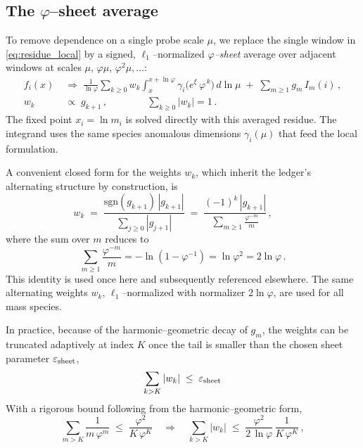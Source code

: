 \documentclass[%
  amsmath,amssymb,
  aps,
 prb,
 floatfix, showkeys
 ]{revtex4-2}
\begin{document}
 \subsection{  The $\varphi$--sheet average} 
 \label{subsec:phi-sheet}
 To remove dependence on a single probe scale $\mu$, we replace the single window
 in \eqref{eq:residue_local} by a signed, $\ell_1$–normalized \emph{$\varphi$–sheet} average
 over adjacent windows at scales $\mu,\,\varphi\mu,\,\varphi^2\mu,\dots$:
 \begin{align}
   f_i(x)
   &\;\Rightarrow\; \frac{1}{\ln\varphi} \sum_{k\ge 0} w_k \int_{x}^{x+\ln\varphi}\!
      \gamma_i\!\big(e^{\xi}\,\varphi^{\,k}\big)\,d\ln\mu \;+\; \sum_{m\ge 1} g_m\,I_m(i)\,,
   \label{eq:sheet_residue}\\[2pt]
   w_k &\;\propto\; g_{k+1}\,,\qquad     %
   \qquad \sum_{k\ge 0} |w_k|=1\,.
 \end{align}
 The fixed point $x_i=\ln m_i$ is solved directly with this averaged residue.
 The integrand uses the same species anomalous dimensions $\gamma_i(\mu)$ that feed the
 local formulation.
 
 A convenient closed form for the weights $w_k$, which inherit the ledger's alternating structure by construction, is
 \begin{equation}
   w_k \;=\; \frac{\mathrm{sgn}(g_{k+1})\,|g_{k+1}|}{\sum_{j\ge 0} |g_{j+1}|}
   \;=\; \frac{(-1)^k\,|g_{k+1}|}{\displaystyle \sum_{m\ge 1} \frac{\varphi^{-m}}{m}}\,,\qquad
   \label{eq:wk_closed_form}
 \end{equation}
 where the sum over $m$ reduces to 
 \begin{equation}
   \sum_{m\ge 1} \frac{\varphi^{-m}}{m} = -\ln(1-\varphi^{-1}) = \ln \varphi^2   = 2\ln\varphi\,.
   \label{eq:wk_closed_form_1}
 \end{equation}
 This identity is used once here and subsequently referenced elsewhere.
 The same alternating weights $w_k$,   $\ell_1$–normalized with normalizer $2\ln\varphi$,
 are used for all mass species.
 
 In practice, because of the harmonic–geometric decay of $g_m$, 
 the weights can be truncated adaptively at index $K$ once the tail is smaller than
 the chosen sheet parameter  $\varepsilon_{\rm sheet}$,
 \begin{equation}
   \sum_{k>K} |w_k| \;\le\; \varepsilon_{\rm sheet}
   \label{eq:sheet_tail_criterion}
 \end{equation}
 With a rigorous bound following from the harmonic–geometric form, 
 \begin{equation}
  \sum_{m>K}\frac{1}{m\,\varphi^m}
 \;\le\; \frac{\varphi^2}{K\,\varphi^{K}}
 \quad\Rightarrow\quad
  \sum_{k>K} |w_k| \;\le\; \frac{\varphi^{2}}{2\,\ln\varphi}\,\frac{1}{K\,\varphi^{K}}\,,
   \label{eq:sheet_tail_bound}
 \end{equation}
 
\end{document}

